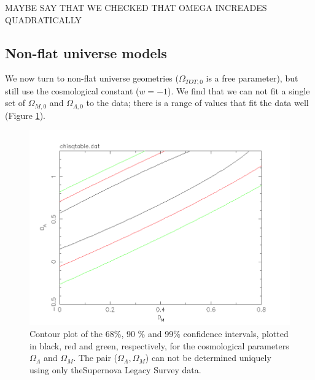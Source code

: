 \documentclass[11pt]{article}
\begin{document}
MAYBE SAY THAT WE CHECKED THAT OMEGA INCREADES QUADRATICALLY



\subsection{Non-flat universe models}
We now turn to non-flat universe geometries ($\Omega_{TOT,0} $ is a free parameter), but still use the cosmological constant ($w = -1$). We find that we can not fit a single set of $\Omega_{M,0}$ and $\Omega_{\Lambda,0}$ to the data; there is a range of values that fit the data well (Figure \ref{fig:nonflat}). 
\begin{figure}[htbp]
	\centering
	\includegraphics[width=0.8\linewidth]{nonflat.png}
	\caption{Contour plot of the 68\%, 90 \% and 99\% confidence intervals, plotted in black, red and green, respectively, for the cosmological parameters $\Omega_\Lambda$ and $\Omega_M$. The pair ($\Omega_\Lambda, \Omega_M$) can not be determined uniquely using only theSupernova Legacy Survey data.}
	\label{fig:nonflat}
\end{figure}
\end{document}

